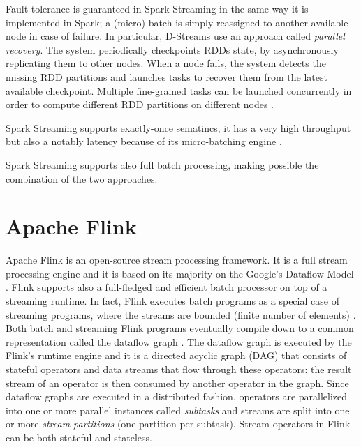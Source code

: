 Fault tolerance is guaranteed in Spark Streaming in the same way it is implemented in Spark; a (micro) batch is simply reassigned to another available node in case of failure. In particular, D-Streams use an approach called \emph{parallel recovery}. The system periodically checkpoints RDDs state, by asynchronously replicating them to other nodes. When a node fails, the system detects the missing RDD partitions and launches tasks to recover them from the latest available checkpoint. Multiple fine-grained tasks can be launched concurrently in order to compute different RDD partitions on different nodes \cite{apachesparkstreaming}. 

Spark Streaming supports exactly-once sematincs, it has a very high throughput but also a notably latency because of its micro-batching engine \cite{streamprocessingcomparison, yahoobenchmarkingonline, zalandobenchmarkingonline}. 

Spark Streaming supports also full batch processing, making possible the combination of the two approaches. 

\section{Apache Flink}
Apache Flink \cite{apacheflinkonline} is an open-source stream processing framework. It is a full stream processing engine and it is based  on its majority on the Google’s Dataflow Model \cite{googledataflow}. Flink supports also a full-fledged and efficient batch processor on top of a streaming runtime. In fact, Flink executes batch programs as a special case of streaming programs, where the streams are bounded (finite number of elements) \cite{apacheflinkstreamandbatch, apacheflinkstatemanagement}. Both batch and streaming Flink programs eventually compile down to a common representation called the dataflow graph \cite{apacheflinkstreamandbatch, apacheflinkstatemanagement}. The dataflow graph is executed by the Flink’s runtime engine and it is a directed acyclic graph (DAG) that consists of stateful operators and data streams that flow through these operators: the result stream of an operator is then consumed by another operator in the graph. Since dataflow graphs are executed in a distributed fashion, operators are parallelized into one or more parallel instances called \emph{subtasks} and streams are split into one or more \emph{stream partitions} (one partition per subtask). Stream operators in Flink can be both stateful and stateless. 

